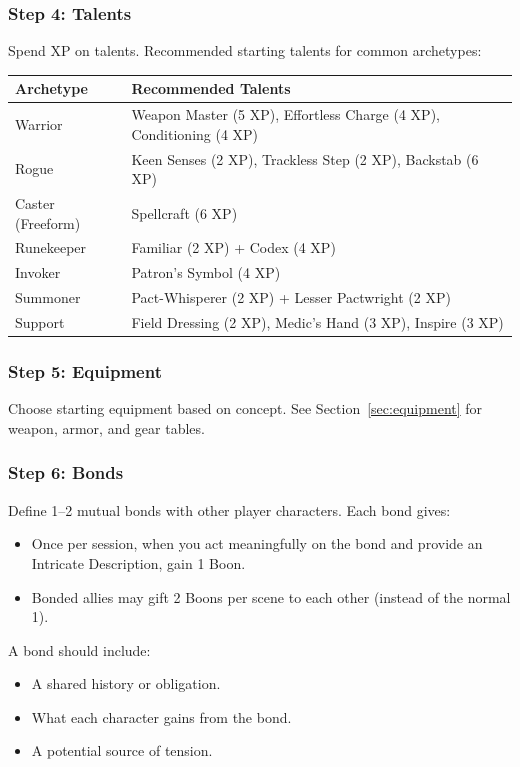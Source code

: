 \subsubsection{Step 4: Talents}
Spend XP on talents. Recommended starting talents for common archetypes:

\begin{tabular}{@{}ll@{}}
\toprule
\textbf{Archetype} & \textbf{Recommended Talents} \\
\midrule
Warrior & Weapon Master (5 XP), Effortless Charge (4 XP), Conditioning (4 XP) \\
Rogue & Keen Senses (2 XP), Trackless Step (2 XP), Backstab (6 XP) \\
Caster (Freeform) & Spellcraft (6 XP) \\
Runekeeper & Familiar (2 XP) + Codex (4 XP) \\
Invoker & Patron's Symbol (4 XP) \\
Summoner & Pact-Whisperer (2 XP) + Lesser Pactwright (2 XP) \\
Support & Field Dressing (2 XP), Medic's Hand (3 XP), Inspire (3 XP) \\
\bottomrule
\end{tabular}

\subsubsection{Step 5: Equipment}
Choose starting equipment based on concept. See Section~\ref{sec:equipment} for weapon, armor, and gear tables.

\subsubsection{Step 6: Bonds}
Define 1–2 mutual bonds with other player characters. Each bond gives:

\begin{itemize}
  \item Once per session, when you act meaningfully on the bond and provide an Intricate Description, gain 1 Boon.
  \item Bonded allies may gift 2 Boons per scene to each other (instead of the normal 1).
\end{itemize}

A bond should include:
\begin{itemize}
  \item A shared history or obligation.
  \item What each character gains from the bond.
  \item A potential source of tension.
\end{itemize}


